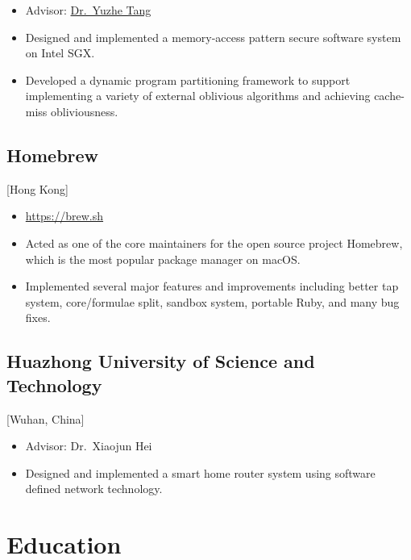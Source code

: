 \documentclass{mycv}
\begin{document}
\begin{itemize}
  \item Advisor: \href{http://tristartom.github.io}{Dr.~Yuzhe Tang}
  \item Designed and implemented a memory-access pattern secure software system on Intel SGX\@.
  \item Developed a dynamic program partitioning framework to support implementing a variety of external oblivious algorithms and achieving cache-miss obliviousness.
\end{itemize}

\subsection{Homebrew}[Hong Kong]
\begin{positions}
\end{positions}

\begin{itemize}
  \item \url{https://brew.sh}
  \item Acted as one of the core maintainers for the open source project Homebrew, which is the most popular package manager on macOS\@.
  \item Implemented several major features and improvements including better tap system, core/formulae split, sandbox system, portable Ruby, and many bug fixes.
\end{itemize}

\subsection{Huazhong University of Science and Technology}[Wuhan, China]
\begin{positions}
\end{positions}

\begin{itemize}
  \item Advisor: Dr.~Xiaojun Hei
  \item Designed and implemented a smart home router system using software defined network technology.
\end{itemize}

\section{Education}
\end{document}
